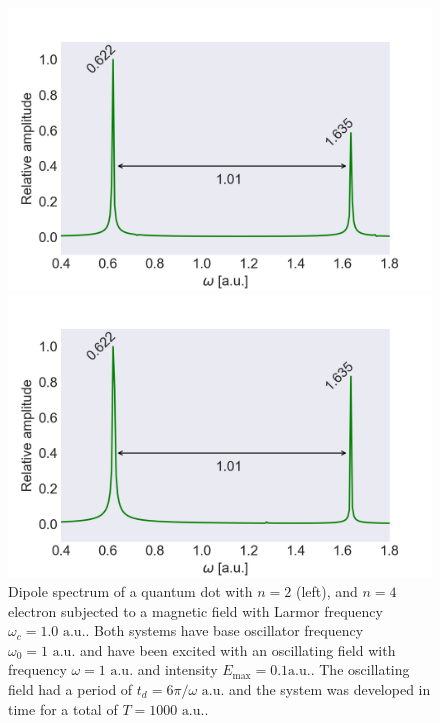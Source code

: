\begin{figure}[!h]
    \centering
    \begin{minipage}{0.49\textwidth}
        \includegraphics[clip=2em 0em 10em 0em, width=\textwidth]
        {results/figures/B_field/n=2/b_spectrum_omc100.png}
    \end{minipage}\hfill 
    \begin{minipage}{0.49\textwidth}
        \includegraphics[clip=0em 0em 10em 0em, width=\textwidth]
        {results/figures/B_field/n=4/b_spectrum_n=4_omc=100.png}
    \end{minipage}
    \caption{Dipole spectrum of a quantum dot with $n=2$ (left), and $n=4$ electron 
    subjected to a magnetic field with Larmor frequency $\omega_c=1.0 \text{ a.u.}$.
    Both systems have base oscillator frequency $\omega_0=1 \text{ a.u.}$ and 
    have been excited with an oscillating field with frequency $\omega = 1 \text{ a.u.}$
    and intensity $E_\text{max} = 0.1 \text{a.u.}$. The oscillating field had a period of 
    $t_d = 6\pi/\omega \text{ a.u.}$ and the system was developed in time for a total 
    of $T = 1000 \text{ a.u.}$.}
    \label{fig:b_omc100}
\end{figure}

\clearemptydoublepage